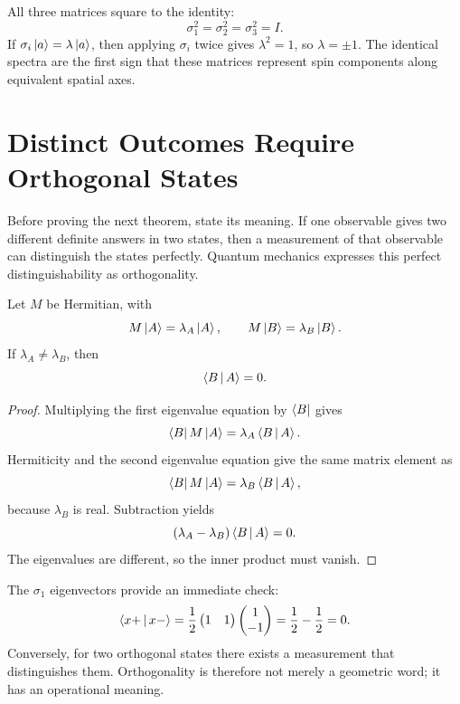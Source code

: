 All three matrices square to the identity:
\begin{equation}
  \sigma_1^2=\sigma_2^2=\sigma_3^2=I.
  \label{eq:l03-pauli-squares}
\end{equation}
If \(\sigma_i\left\lvert a\right\rangle=\lambda\left\lvert a\right\rangle\), then applying \(\sigma_i\) twice gives \(\lambda^2=1\), so \(\lambda=\pm1\). The identical spectra are the first sign that these matrices represent spin components along equivalent spatial axes.

\section{Distinct Outcomes Require Orthogonal States}

Before proving the next theorem, state its meaning. If one observable gives two different definite answers in two states, then a measurement of that observable can distinguish the states perfectly. Quantum mechanics expresses this perfect distinguishability as orthogonality.

\begin{theorem}
Let \(M\) be Hermitian, with
\begin{equation}
  M\left\lvert A\right\rangle=\lambda_A\left\lvert A\right\rangle,
  \qquad
  M\left\lvert B\right\rangle=\lambda_B\left\lvert B\right\rangle.
\end{equation}
If \(\lambda_A\ne\lambda_B\), then
\begin{equation}
  \left\langle B\,\middle|\,A\right\rangle=0.
\end{equation}
\end{theorem}

\begin{proof}
Multiplying the first eigenvalue equation by \(\left\langle B\right\rvert\) gives
\begin{equation}
  \left\langle B\right\rvert M\left\lvert A\right\rangle=\lambda_A\left\langle B\,\middle|\,A\right\rangle.
\end{equation}
Hermiticity and the second eigenvalue equation give the same matrix element as
\begin{equation}
  \left\langle B\right\rvert M\left\lvert A\right\rangle=\lambda_B\left\langle B\,\middle|\,A\right\rangle,
\end{equation}
because \(\lambda_B\) is real. Subtraction yields
\begin{equation}
  (\lambda_A-\lambda_B)\left\langle B\,\middle|\,A\right\rangle=0.
\end{equation}
The eigenvalues are different, so the inner product must vanish.
\end{proof}

The \(\sigma_1\) eigenvectors provide an immediate check:
\begin{equation}
  \left\langle x+\,\middle|\,x-\right\rangle
  =
  \frac12
  \begin{pmatrix}1&1\end{pmatrix}
  \begin{pmatrix}1\\-1\end{pmatrix}
  =\frac12-\frac12=0.
\end{equation}
Conversely, for two orthogonal states there exists a measurement that distinguishes them. Orthogonality is therefore not merely a geometric word; it has an operational meaning.

